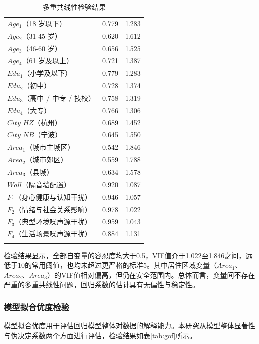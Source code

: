 \begin{table}[H]
\centering
\caption{多重共线性检验结果}
\label{tab:vif}
\begin{tabular}{M{6.4cm}M{3.4cm}M{2.4cm}}
\bluetoprule
{}
 &  &  \\
\hline
$Age_1$（18 岁以下） & 0.779 & 1.283 \\
$Age_2$（31-45 岁） & 0.620 & 1.612 \\
$Age_3$（46-60 岁） & 0.656 & 1.525 \\
$Age_4$（61 岁及以上） & 0.721 & 1.387 \\
$Edu_1$（小学及以下） & 0.779 & 1.283 \\
$Edu_2$（初中） & 0.728 & 1.374 \\
$Edu_3$（高中 / 中专 / 技校） & 0.758 & 1.319 \\
$Edu_4$（大专） & 0.766 & 1.306 \\
$City\_HZ$（杭州） & 0.689 & 1.452 \\
$City\_NB$（宁波） & 0.645 & 1.550 \\
$Area_1$（城市主城区） & 0.542 & 1.846 \\
$Area_2$（城市郊区） & 0.559 & 1.788 \\
$Area_3$（县城） & 0.634 & 1.578 \\
$Wall$（隔音墙配置） & 0.920 & 1.087 \\
$F_1$（身心健康与认知干扰） & 0.946 & 1.057 \\
$F_2$（情绪与社会关系影响） & 0.978 & 1.022 \\
$F_3$（典型环境噪声源干扰） & 0.959 & 1.043 \\
$F_4$（生活场景噪声源干扰） & 0.884 & 1.131 \\
\bluebottomrule
\end{tabular}
\end{table}

检验结果显示，全部自变量的容忍度均大于0.5，VIF值介于1.022至1.846之间，远低于10的常用阈值，也均未超过更严格的标准5。其中居住区域变量（$Area_1$、$Area_2$、$Area_3$）的VIF值相对偏高，但仍在安全范围内。总体而言，变量间不存在严重的多重共线性问题，回归系数的估计具有无偏性与稳定性。

\subsubsection{模型拟合优度检验}

模型拟合优度用于评估回归模型整体对数据的解释能力。本研究从模型整体显著性与伪决定系数两个方面进行评估，检验结果如表\ref{tab:gof}所示。

